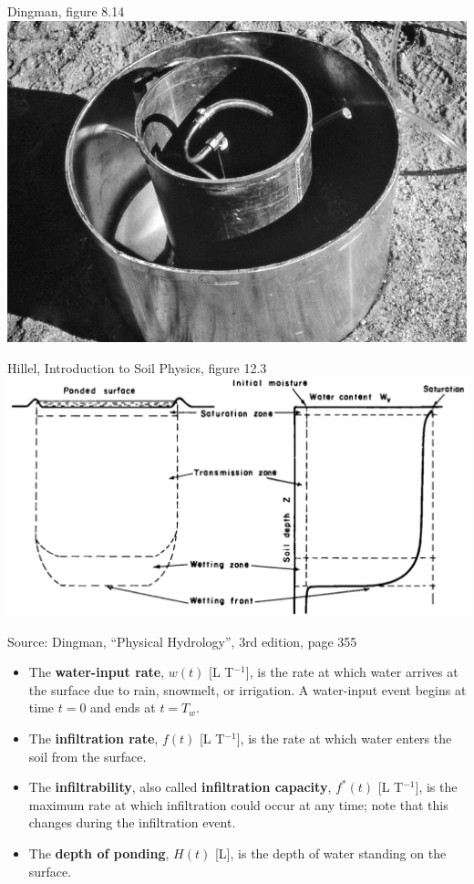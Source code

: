 \documentclass[
  letterpaper,
  DIV=11,
  numbers=noendperiod]{scrreprt}
\providecommand{\tightlist}{%
  \setlength{\itemsep}{0pt}\setlength{\parskip}{0pt}}\usepackage{longtable,booktabs,array}
\begin{document}
Dingman, figure 8.14
\includegraphics{archive/figures/dingman-figure8.14.png}

Hillel, Introduction to Soil Physics, figure 12.3
\includegraphics{archive/figures/hillel_introduction_soil_physics_figure12.3.png}

Source: Dingman, ``Physical Hydrology'', 3rd edition, page 355

\begin{itemize}
\tightlist
\item
  The \textbf{water-input rate}, \(w(t)\) {[}L T\(^{-1}\){]}, is the
  rate at which water arrives at the surface due to rain, snowmelt, or
  irrigation. A water-input event begins at time \(t=0\) and ends at
  \(t=T_w\).
\item
  The \textbf{infiltration rate}, \(f(t)\) {[}L T\(^{-1}\){]}, is the
  rate at which water enters the soil from the surface.
\item
  The \textbf{infiltrability}, also called \textbf{infiltration
  capacity}, \(f^*(t)\) {[}L T\(^{-1}\){]}, is the maximum rate at which
  infiltration could occur at any time; note that this changes during
  the infiltration event.
\item
  The \textbf{depth of ponding}, \(H(t)\) {[}L{]}, is the depth of water
  standing on the surface.
\end{itemize}
\end{document}
